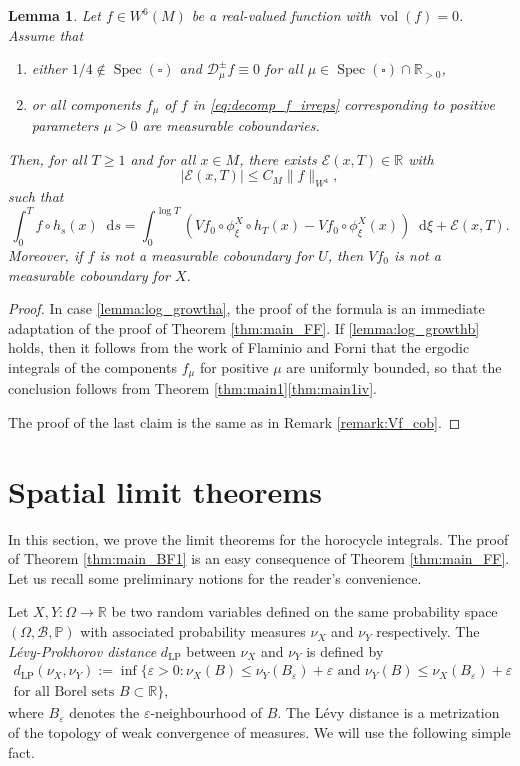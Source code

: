 \documentclass[10pt]{amsart}
\newenvironment{enumeratea}
{\bgroup\def\theenumi{\alph{enumi}}\begin{enumerate}}
{\end{enumerate}\egroup}
\newcommand \R{\mathbb{R}}
\newcommand*{\diff}{\mathop{}\!\mathrm{d}}
\newcommand{\Dpm}[1]{\mathcal{D}_\mu^{\pm} #1}
\newcommand{\Levy}{d_{\levyy}}
\DeclareMathOperator{\vol}{vol}
\DeclareMathOperator{\Spec}{Spec}
\DeclareMathOperator{\levyy}{LP}
\newtheorem {lemma}[theorem]{Lemma}
\theoremstyle{definition}
\begin{document}
\begin{lemma}\label{lemma:log_growth}
Let $f \in W^6(M)$ be a real-valued function with $\vol(f)=0$.
Assume that
\begin{enumeratea}
\item\label{lemma:log_growtha}
either $1/4 \notin \Spec(\square)$ and $\Dpm{f} \equiv 0$ for all $\mu \in \Spec(\square) \cap \R_{>0}$,
\item\label{lemma:log_growthb}
or all components $f_\mu$ of $f$ in \eqref{eq:decomp_f_irreps} corresponding to positive parameters $\mu >0$ are measurable coboundaries.
\end{enumeratea}
Then, for all $T \geq 1$ and for all $x \in M$, there exists $\mathcal{E}(x,T) \in \R$ with
\[
|\mathcal{E}(x,T) |\leq C_M \|f\|_{W^4},
\]
such that
\[
\int_0^T f \circ h_s(x) \diff s = \int_0^{\log T} \left(Vf_0 \circ \phi^X_{\xi}\circ h_T(x) - Vf_0\circ \phi^X_{\xi}(x) \right) \diff \xi + \mathcal{E}(x,T).
\]
Moreover, if $f$ is not a measurable coboundary for $U$, then $Vf_0$ is not a measurable coboundary for $X$.
\end{lemma}

\begin{proof}
In case \eqref{lemma:log_growtha}, the proof of the formula is an immediate adaptation of the proof of Theorem \ref{thm:main_FF}. If \eqref{lemma:log_growthb} holds, then it follows from the work of Flaminio and Forni that the ergodic integrals of the components $f_\mu$ for positive $\mu$ are uniformly bounded, so that the conclusion follows from Theorem \ref{thm:main1}\eqref{thm:main1iv}.

The proof of the last claim is the same as in Remark \ref{remark:Vf_cob}.
\end{proof}

\section{Spatial limit theorems}\label{sec:limit}

In this section, we prove the limit theorems for the horocycle integrals. The proof of Theorem \ref{thm:main_BF1} is an easy consequence of Theorem \ref{thm:main_FF}. Let us recall some preliminary notions for the reader's convenience.

Let $X,Y \colon \Omega \to \R$ be two random variables defined on the same probability space $(\Omega, \mathcal{B}, \mathbb{P})$ with associated probability measures $\nu_X$ and $\nu_Y$ respectively.
The \emph{Lévy-Prokhorov distance} $\Levy$ between $\nu_X$ and $\nu_Y$ is defined by
\begin{multline*}
\Levy(\nu_X, \nu_Y) := \inf \{\varepsilon > 0 : \nu_X(B) \leq \nu_Y(B_{\varepsilon}) + \varepsilon \text{\ and\ } \nu_Y(B) \leq \nu_X(B_{\varepsilon}) + \varepsilon \\
\text{for all Borel sets\ } B \subset \R\},
\end{multline*}
where $B_{\varepsilon}$ denotes the $\varepsilon$-neighbourhood of $B$.
The Lévy distance is a metrization of the topology of weak convergence of measures.
We will use the following simple fact.
\end{document}
